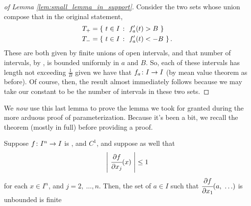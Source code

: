   \begin{proof}[of Lemma \ref{lem:small_lemma_in_support}]
    Consider the two sets whose union compose that in the original statement,
      \begin{align*}
        T_{+} &= \left\{ \ t \in I \ \colon \ \pri{f_a}(t) > B \ \right\} \\
        T_{-} &= \left\{ \ t \in I \ \colon \ \pri{f_a}(t) < -B \ \right\}.
      \end{align*}
    These are both given by finite unions of open intervals, and that number of intervals, by \om, is bounded uniformly in $a$ and $B$. So, each of these intervals has length not exceeding $\frac{1}{B}$ given we have that $f_a \colon I \to I$ (by mean value theorem as before). Of course, then, the result almost immediately follows because we may take our constant to be the number of intervals in these two sets.
  \end{proof}

We \emph{now} use this last lemma to prove the lemma we took for granted during the more arduous proof of parameterization. Because it's been a bit, we recall the theorem (mostly in full) before providing a proof.

  \begin{lemma}
    Suppose $f \colon I^n \to I$ is , and $C^1$, and suppose as well that
    \begin{align*}
      \left\vert \  \cfrac{\partial f}{\partial x_j}(x)  \ \right\vert \leq 1
    \end{align*}
    for each $x \in I^n$, and $j = 2, \ \hdots, n$. Then, the set of $a \in I$ such that $\cfrac{\partial f}{\partial x_1}(a, \ \hdots)$ is unbounded is finite
  \end{lemma}

